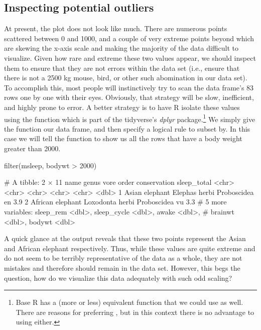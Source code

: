 \subsection{Inspecting potential outliers}

At present, the plot does not look like much.  There are numerous points scattered between 0 and 1000, and a couple of very extreme points beyond which are skewing the x-axis scale and making the majority of the data difficult to visualize. Given how rare and extreme these two values appear, we should inspect them to ensure that they are not errors within the data set (i.e., ensure that there is not a 2500 kg mouse, bird, or other such abomination in our data set). To accomplish this, most people will instinctively try to scan the data frame's 83 rows one by one with their eyes. Obviously, that strategy will be slow, inefficient, and highly prone to error.  A better strategy is to have R isolate these values using the  function which is part of the tidyverse's \textit{dplyr} package.\footnote{Base R has a (more or less) equivalent function  that we could use as well. There are reasons for preferring , but in this context there is no advantage to using either.}  We simply give the function our data frame, and then specify a logical rule to subset by. In this case we will tell the function to show us all the rows that have a body weight greater than 2000.

\begin{inR}
filter(msleep, bodywt > 2000)
\end{inR}

\begin{outR}
# A tibble: 2 × 11
  name             genus     vore  order       conservation sleep_total
  <chr>            <chr>     <chr> <chr>       <chr>              <dbl>
1 Asian elephant   Elephas   herbi Proboscidea en                   3.9
2 African elephant Loxodonta herbi Proboscidea vu                   3.3
# 5 more variables: sleep_rem <dbl>, sleep_cycle <dbl>, awake <dbl>, 
# brainwt <dbl>, bodywt <dbl>
\end{outR}

A quick glance at the output reveals that these two points represent the Asian and African elephant respectively.  Thus, while these values are quite extreme and do not seem to be terribly representative of the data as a whole, they are not mistakes and therefore should remain in the data set.  However, this begs the question, how do we visualize this data adequately with such odd scaling?

